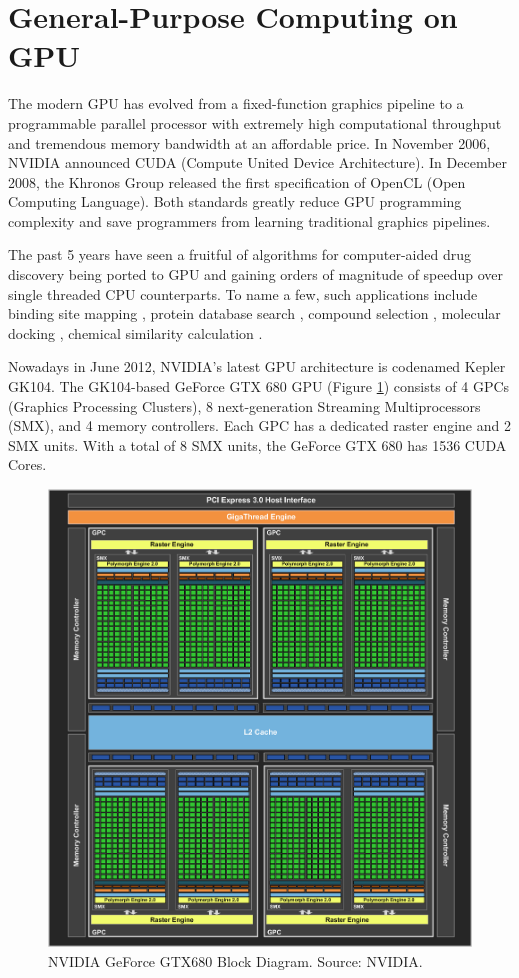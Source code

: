 \section{General-Purpose Computing on GPU}

The modern GPU has evolved from a fixed-function graphics pipeline to a programmable parallel processor with extremely high computational throughput and tremendous memory bandwidth at an affordable price. In November 2006, NVIDIA announced CUDA (Compute United Device Architecture). In December 2008, the Khronos Group released the first specification of OpenCL (Open Computing Language). Both standards greatly reduce GPU programming complexity and save programmers from learning traditional graphics pipelines.

The past 5 years have seen a fruitful of algorithms for computer-aided drug discovery being ported to GPU and gaining orders of magnitude of speedup over single threaded CPU counterparts. To name a few, such applications include binding site mapping \citep{722}, protein database search \citep{189}, compound selection \citep{750}, molecular docking \citep{723,652,779}, chemical similarity calculation \citep{726}.

Nowadays in June 2012, NVIDIA’s latest GPU architecture is codenamed Kepler GK104. The GK104-based GeForce GTX 680 GPU (Figure \ref{GPU:GeForceGTX680BlockDiagram}) consists of 4 GPCs (Graphics Processing Clusters), 8 next-generation Streaming Multiprocessors (SMX), and 4 memory controllers. Each GPC has a dedicated raster engine and 2 SMX units. With a total of 8 SMX units, the GeForce GTX 680 has 1536 CUDA Cores.

\begin{figure}
\centering
\includegraphics[width=\textwidth]{GPU/GeForceGTX680BlockDiagram.png}
\caption{NVIDIA GeForce GTX680 Block Diagram. Source: NVIDIA.}
\label{GPU:GeForceGTX680BlockDiagram}
\end{figure}

